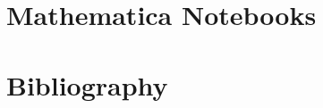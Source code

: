 \documentclass[12pt,leqno]{book}
\begin{document}
\part{Mathematica Notebooks}


%
\part{Bibliography}




\end{document}
